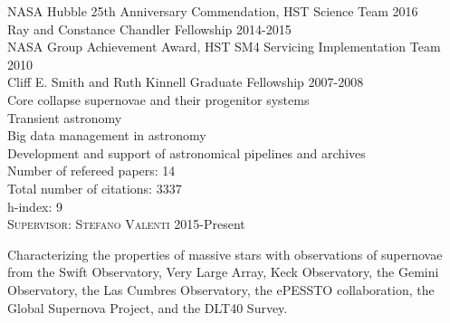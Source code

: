 \documentclass[10pt]{cv}
\begin{document}
\begin{llist}
\vspace{-0.1in}   
NASA Hubble 25th Anniversary Commendation, HST Science Team \hfill 2016 \\ %
Ray and Constance Chandler Fellowship \hfill 2014-2015 \\ %
NASA Group Achievement Award, HST SM4 Servicing Implementation Team \hfill2010 \\
Cliff E. Smith and Ruth Kinnell Graduate Fellowship \hfill 2007-2008\\ %
\vspace{-0.1in}   
Core collapse supernovae and their progenitor systems\\
Transient astronomy\\
Big data management in astronomy\\
Development and support of astronomical pipelines and archives\\ 
\vspace{-0.1in}   
\vspace{-0.1in}   
Number of refereed papers: 14\\
Total number of citations: 3337\\
h-index: 9\\
\vspace{-0.1in}   
\textsc{Supervisor: Stefano Valenti} \hfill 2015-Present\\
\begin{minipage}[l]{0.7\textwidth}\vspace{0.15cm}
Characterizing the properties of massive stars with observations of supernovae from the Swift Observatory, Very Large Array, Keck Observatory, the Gemini Observatory, the Las Cumbres Observatory, the ePESSTO collaboration, the Global Supernova Project, and the DLT40 Survey.\\

\end{minipage}
\end{llist}
\end{document}
